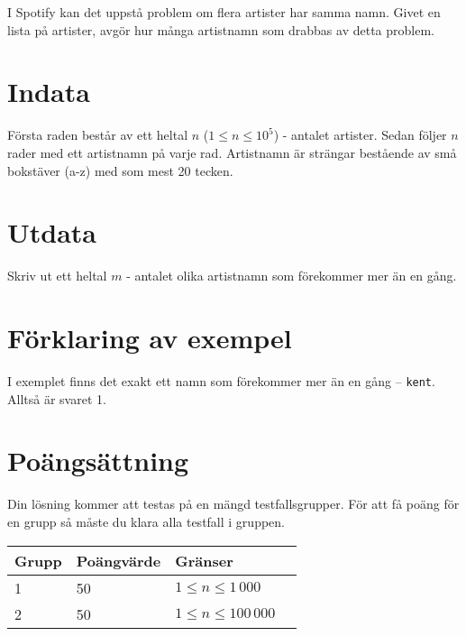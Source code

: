 
I Spotify kan det uppstå problem om flera artister har samma namn. Givet en lista på artister, avgör hur många artistnamn som drabbas av detta problem.

\section*{Indata}

Första raden består av ett heltal $n$ ($1 \leq n \leq 10^5$) - antalet artister. Sedan följer $n$ rader med ett artistnamn på varje rad. Artistnamn är strängar bestående av små bokstäver (a-z) med som mest 20 tecken.

\section*{Utdata}

Skriv ut ett heltal $m$ - antalet olika artistnamn som förekommer mer än en gång.

\section*{Förklaring av exempel}

I exemplet finns det exakt ett namn som förekommer mer än en gång -- \texttt{kent}. Alltså är svaret 1.

\section*{Poängsättning}

Din lösning kommer att testas på en mängd testfallsgrupper. För att få poäng för en grupp
så måste du klara alla testfall i gruppen.

\begin{tabular}{| l | l | l | l |}
\hline
Grupp & Poängvärde & Gränser \\ \hline
1     & 50         & $ 1 \le n \le 1\,000$ \\ \hline
2     & 50         & $ 1 \le n \le 100\,000$ \\ \hline
\end{tabular}

